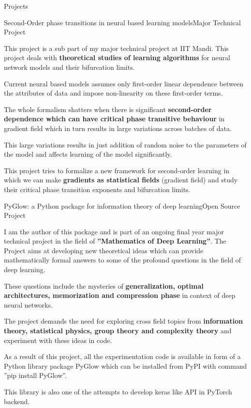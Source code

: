 \documentclass{resume} %
\begin{document}
\begin{rSection}{Projects}

\begin{rSubsection}{Second-Order phase transitions in neural based learning models}{Major Technical Project}{}{}
    \item This project is a sub part of my major technical project at IIT Mandi. This project deals with \textbf{theoretical studies of learning algorithms} for neural network models and their bifurcation limits.
    \item Current neural based models assumes only first-order linear dependence between the attributes of data and impose non-linearity on these first-order terms.
    \item The whole formalism shatters when there is significant \textbf{second-order dependence which can have critical phase transitive behaviour} in gradient field which in turn results in large variations across batches of data.
    \item This large variations results in just addition of random noise to the parameters of the model and affects learning of the model significantly.
    \item This project tries to formalize a new framework for second-order learning in which we can make \textbf{gradients as statistical fields} (gradient field) and study their critical phase transition exponents and bifurcation limits.
\end{rSubsection}
\newpage
\begin{rSubsection}{PyGlow: a Python package for information theory of deep learning}{Open Source Project}{}{}
\item I am the author of this package and is part of an ongoing final year major technical project in the field of \textbf{”Mathematics of Deep Learning”}. The Project aims at developing new theoretical ideas which can provide mathematically formal answers to some of the profound questions in the field of deep learning.
    \item These questions include the mysteries of \textbf{generalization, optimal architectures, memorization and compression phase} in context of deep neural networks.
    \item The project demands the need for exploring cross field topics from \textbf{information theory, statistical physics, group theory and complexity theory} and experiment with these ideas in code.
    \item As a result of this project, all the experimentation code is available in form of a Python library package PyGlow which can be installed from PyPI with command ”pip install PyGlow”.
    \item This library is also one of the attempts to develop keras like API in PyTorch backend.
\end{rSubsection}


\end{rSection}
\end{document}
